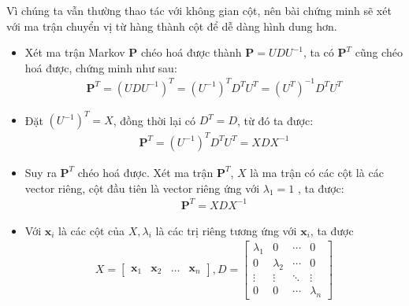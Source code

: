 \begin{proofvn}
    Vì chúng ta vẫn thường thao tác với không gian cột, nên bài chứng minh sẽ xét với ma trận chuyển vị từ hàng thành cột để dễ dàng hình dung hơn.
    \begin{itemize}
        \item Xét ma trận Markov $\mathbf{P}$ chéo hoá được thành $\mathbf{P} = U D U^{-1}$, ta có $\mathbf{P}^T$ cũng chéo hoá được, chứng minh như sau: 
        \begin{align}
            \mathbf{P}^T = (U D U^{-1})^T = (U^{-1})^T D^T U^T = (U^{T})^{-1} D^T U^T
        \end{align}

        \item Đặt $(U^{-1})^T = X$, đồng thời lại có $D^T = D$, từ đó ta được:
        \begin{align}
            \mathbf{P}^T = (U^{-1})^T D^T U^T = X D X^{-1}
        \end{align}

        \item Suy ra $\mathbf{P}^T$ chéo hoá được. Xét ma trận $\mathbf{P}^T$, $X$ là ma trận có các cột là các vector riêng, cột đầu tiên là vector riêng ứng với $\lambda_1 = 1$ , ta được:
        \begin{align}
            \mathbf{P}^T = X D X^{-1}
        \end{align}
        \item Với $\textbf{x}_i$ là các cột của $X, \lambda_i$ là các trị riêng tương ứng với $\textbf{x}_i$, ta được
        \begin{align}
            X = \begin{bmatrix}
            \textbf{x}_1& \textbf{x}_2 & \dots& \textbf{x}_n
            \end{bmatrix}, D = \begin{bmatrix}
            \lambda_1&0& \dotsb &0\\
            0&\lambda_2& \dotsb &0\\
            \vdots & \vdots & \ddots & \vdots\\
            0&0&\dotsb & \lambda_n
            \end{bmatrix}
        \end{align}


\end{itemize}
\end{proofvn}
